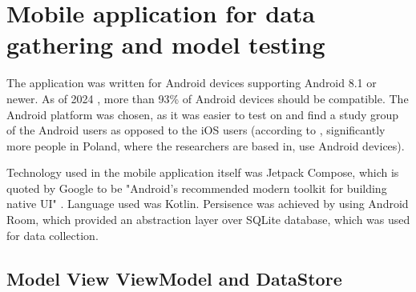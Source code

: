 
\section{Mobile application for data gathering and model testing}

The application was written for Android devices supporting Android 8.1 or newer. As of 2024 \cite{androidStats}, more than 93\% of Android devices should be compatible. The Android platform was chosen, as it was easier to test on and find a study group of the Android users as opposed to the iOS users (according to \cite{operatingSystemDistribution} , significantly more people in Poland, where the researchers are based in, use Android devices).

Technology used in the mobile application itself was Jetpack Compose, which is quoted by Google to be "Android’s recommended modern toolkit for building native UI" \cite{jetpackCompose}. Language used was Kotlin. Persisence was achieved by using Android Room, which provided an abstraction layer over SQLite database, which was used for data collection.

\subsection{Model View ViewModel and DataStore}

